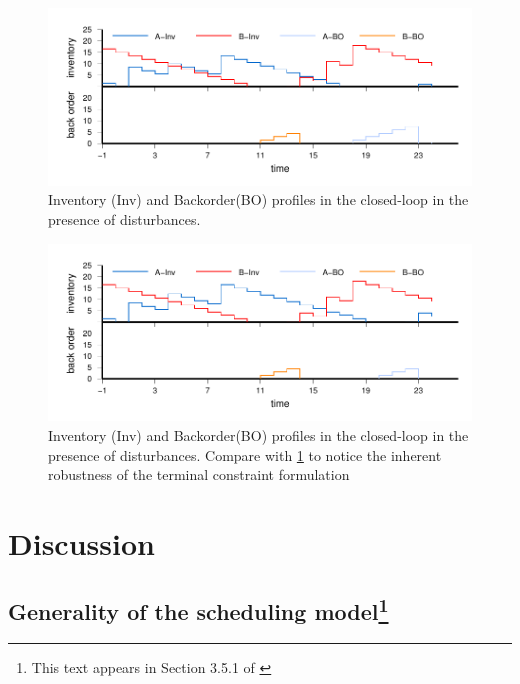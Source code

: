 \begin{figure}
\begin{center}
\includegraphics{scheduling/CL_NT_disturbance.pdf}
\caption[Closed-loop with disturbances]{Inventory (Inv) and Backorder(BO) profiles in the closed-loop
  in the presence of disturbances.}
\label{fig:scheduling:CL_NT_disturbance}
\end{center}
\end{figure}


\begin{figure}
\begin{center}
\includegraphics{scheduling/CL_T_disturbance.pdf}
\caption[Closed-loop for terminal constraint formulation with disturbances]{Inventory (Inv) and Backorder(BO) profiles in the closed-loop
  in the presence of disturbances. Compare with
  \ref{fig:scheduling:CL_NT_disturbance} to notice the inherent
  robustness of the terminal constraint formulation}
\label{fig:scheduling:CL_T_disturbance}
\end{center}
\end{figure}




\section{Discussion}
\subsection{Generality of the scheduling model\footnote{This text appears in Section 3.5.1 of \citet{subramanian:maravelias:rawlings:2012}}}


